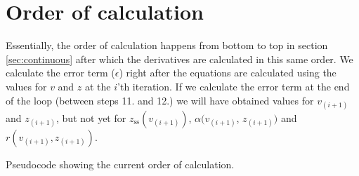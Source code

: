 \documentclass{article}
\begin{document}
\section{Order of calculation}
Essentially, the order of calculation happens from bottom to top in section \ref{sec:continuous} after which the derivatives are calculated in this same order. We calculate the error term ($\epsilon$) right after the equations are calculated using the values for $v$ and $z$ at the $i$'th iteration. If we calculate the error term at the end of the loop (between steps 11. and 12.) we will have obtained values for $v_{(i+1)}$ and $z_{(i+1)}$, but not yet for $z_\text{ss}(v_{(i+1)})$, $\alpha(v_{(i+1)}$, $z_{(i+1)})$ and $r(v_{(i+1)}, z_{(i+1)})$. 
\begin{algorithm}[h]\label{alg:calcOrder}
 \caption{Pseudocode showing the current order of calculation.}
\end{algorithm}
\end{document}

